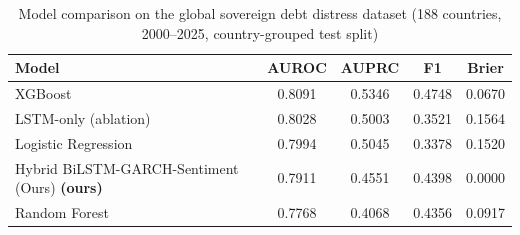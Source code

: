 \begin{table}[htbp]
\centering
\caption{Model comparison on the global sovereign debt distress dataset (188 countries, 2000--2025, country-grouped test split)}
\label{tab:global_comparison}
\begin{tabular}{lcccc}
\toprule
Model & AUROC & AUPRC & F1 & Brier \\
\midrule
XGBoost  & 0.8091 & 0.5346 & 0.4748 & 0.0670 \\
LSTM-only (ablation)  & 0.8028 & 0.5003 & 0.3521 & 0.1564 \\
Logistic Regression  & 0.7994 & 0.5045 & 0.3378 & 0.1520 \\
Hybrid BiLSTM-GARCH-Sentiment (Ours) \textbf{(ours)} & 0.7911 & 0.4551 & 0.4398 & 0.0000 \\
Random Forest  & 0.7768 & 0.4068 & 0.4356 & 0.0917 \\
\bottomrule
\end{tabular}
\end{table}